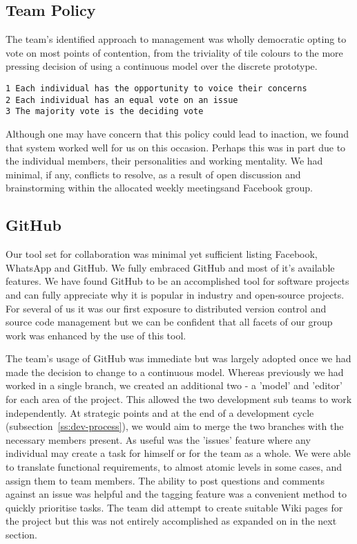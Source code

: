 \subsection{Team Policy}
The team's identified approach to management was wholly democratic opting to vote on most points of contention, from the triviality of tile colours to the more pressing decision of using a continuous model over the discrete prototype.

\begin{lstlisting}[caption={Decision Making Agreement}]
1 Each individual has the opportunity to voice their concerns
2 Each individual has an equal vote on an issue
3 The majority vote is the deciding vote
\end{lstlisting}
 
Although one may have concern that this policy could lead to inaction, we found that system worked well for us on this occasion. Perhaps this was in part due to the individual members, their personalities and working mentality. We had minimal, if any, conflicts to resolve, as a result of open discussion and brainstorming within the allocated weekly meetings\footnotemark[02] and Facebook group.

\subsection{GitHub}
Our tool set for collaboration was minimal yet sufficient listing Facebook, WhatsApp and GitHub. We fully embraced GitHub and most of it's available features. We have found GitHub to be an accomplished tool for software projects and can fully appreciate why it is popular in industry and open-source projects. For several of us it was our first exposure to distributed version control and source code management but we can be confident that all facets of our group work was enhanced by the use of this tool.

The team's usage of GitHub was immediate but was largely adopted once we had made the decision to change to a continuous model. Whereas previously we had worked in a single branch, we created an additional two - a 'model' and 'editor' for each area of the project.  This allowed the two development sub teams to work independently. At strategic points and at the end of a development cycle (subsection~\ref{ss:dev-process}), we would aim to merge the two branches with the necessary members present. As useful was the 'issues' feature where any individual may create a task for himself or for the team as a whole. We were able to translate functional requirements, to almost atomic levels in some cases, and assign them to team members. The ability to post questions and comments against an issue was helpful and the tagging feature was a convenient method to quickly prioritise tasks. The team  did attempt to create suitable Wiki pages for the project but this was not entirely accomplished as expanded on in the next section.

